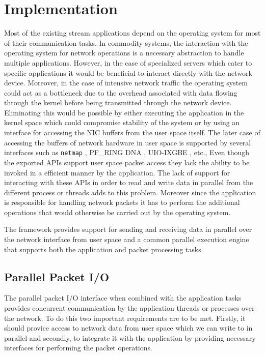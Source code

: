 \documentclass[conference]{IEEEtran}
\begin{document}
\section{Implementation}
\label{imple}

Most of the existing stream applications depend on the operating system for most of their communication tasks. In commodity systems, the interaction with the operating system for network operations is a necessary abstraction to handle multiple applications. However, in the case of specialized servers which cater to specific applications it would be beneficial to interact directly with the network device. Moreover, in the case of intensive network traffic the operating system could act as a bottleneck due to the overhead associated with data flowing through the kernel before being transmitted through the network device\cite{Wu:2007:PPB:1323954.1323957}\cite{Wu:2007:PAL:1227865.1228021}. Eliminating this would be possible by either executing the application in the kernel space which could compromise stability of the system or by using an interface for accessing the NIC buffers from the user space itself. The later case of accessing the buffers of network hardware in user space is supported by several interfaces such as \texttt{netmap} \cite{Rizzo:2012:RNI:2090147.2103536}, PF\_RING DNA \cite{1564468}, UIO-IXGBE \cite{Krasnyansky}, etc., Even though the exported APIs support user space packet access they lack the ability to be invoked in a efficient manner by the application. The lack of support for interacting with these APIs in order to read and write data in parallel from the different process or threads adds to this problem. Moreover since the application is responsible for handling network packets it has to perform the additional operations that would otherwise be carried out by the operating system. 

The framework provides support for sending and receiving data in parallel over the network interface from user space and a common parallel execution engine that supports both the application and packet processing tasks. 

\subsection{Parallel Packet I/O}
\label{ppio}
The parallel packet I/O interface when combined with the application tasks provides concurrent communication by the application threads or processes over the network. To do this two important requirements are to be met. Firstly, it should provice access to network data from user space which we can write to in parallel and secondly, to integrate it with the application by providing necessary interfaces for performing the packet operations.
\end{document}
